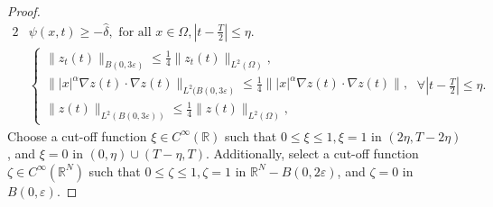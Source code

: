 \documentclass[11pt]{article}
\numberwithin{equation}{section}
\def\e{\varepsilon }
\def\fa{\forall}
\def\Om{\Omega}
\def\al{\alpha}
\def\de{\delta}
\def\iy{\infty}
\def\f{\frac}
\def\wh{\widehat}
\newcommand{\R}{\mathbb R}
\begin{document}
\begin{proof}
\begin{alignat}{2}
				& \psi(x,t)\geq -\wh \de, \mbox{ for all }  x\in \Om, \left|t-\f{T}{2}\right|\leq \eta. \label{10.03.3}\\
				&
				\begin{cases}
					\|z_t(t)\|_{B(0,3\e)}\leq \f{1}{4}\|z_t(t)\|_{L^2(\Om)}, \\ \||x|^\al \nabla z(t)\cdot \nabla z(t)\|_{L^2(B(0,3\e)}\leq \f{1}{4}\||x|^\al \nabla z(t)\cdot \nabla z(t)\|, \\
					\|z(t)\|_{L^2(B(0,3\e))}\leq \f{1}{4}\|z(t)\|_{L^2(\Om)},
				\end{cases}\ \fa \left|t-\f{T}{2}\right|\leq \eta. \label{10.03.5}
			\end{alignat}
			Choose a cut-off function $\xi\in C^\iy(\R)$  such that
			$0\leq \xi\leq 1, \xi=1$ in $(2\eta, T-2\eta)$, and $\xi=0$ in $(0,\eta)\cup (T-\eta, T)$.   Additionally, select a cut-off function
			$\zeta\in C^\iy(\R^N)$ such that $0\leq \zeta\leq 1, \zeta=1$ in $\R^N-B(0,2\e)$, and $\zeta=0$ in $B(0,\e)$.
			

\end{proof}
\end{document}
